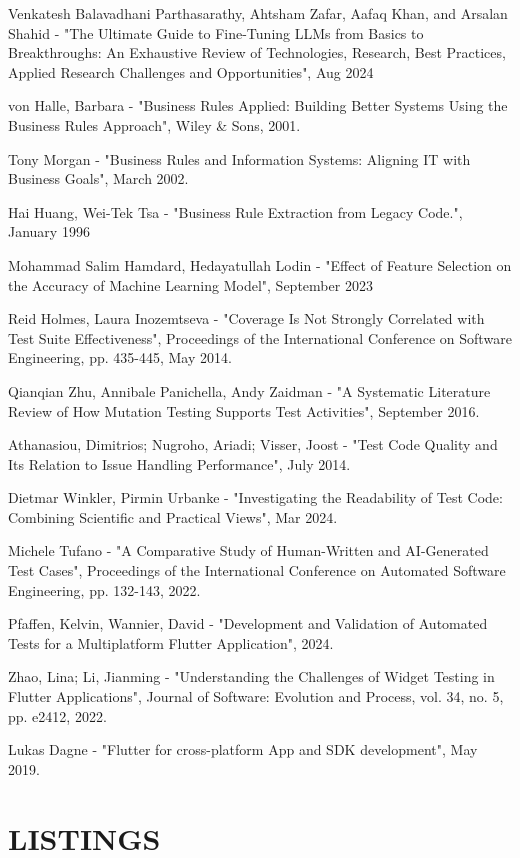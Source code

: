 \documentclass[12pt, twoside]{report}
\makeatletter
\newcommand\AppendixName{Appendix}
\let\oldappendix\appendix
\renewcommand{\appendix}{%
  \oldappendix
  \renewcommand{\chaptername}{\AppendixName}  \renewcommand{\thechapter}{\@Alph\c@chapter}}
\makeatother
\begin{document}
\begin{thebibliography}{99}
Venkatesh Balavadhani Parthasarathy, Ahtsham Zafar, Aafaq Khan, and Arsalan Shahid - "The Ultimate Guide to Fine-Tuning LLMs from Basics to Breakthroughs: An Exhaustive Review of Technologies, Research, Best Practices, Applied Research Challenges and Opportunities", Aug 2024

von Halle, Barbara - "Business Rules Applied: Building Better Systems Using the Business Rules Approach", Wiley \& Sons, 2001.

Tony Morgan - "Business Rules and Information Systems: Aligning IT with Business Goals", March 2002.

Hai Huang, Wei-Tek Tsa - "Business Rule Extraction from Legacy Code.", January 1996

Mohammad Salim Hamdard, Hedayatullah Lodin - "Effect of Feature Selection on the Accuracy of Machine Learning Model", September 2023

Reid Holmes, Laura Inozemtseva - "Coverage Is Not Strongly Correlated with Test Suite Effectiveness", Proceedings of the International Conference on Software Engineering, pp. 435-445, May 2014.

Qianqian Zhu, Annibale Panichella, Andy Zaidman - "A Systematic Literature Review of How Mutation Testing Supports Test Activities", September 2016.

Athanasiou, Dimitrios; Nugroho, Ariadi; Visser, Joost - "Test Code Quality and Its Relation to Issue Handling Performance", July 2014.

Dietmar Winkler, Pirmin Urbanke - "Investigating the Readability of Test Code: Combining Scientific and Practical Views", Mar 2024.

Michele Tufano - "A Comparative Study of Human-Written and AI-Generated Test Cases", Proceedings of the International Conference on Automated Software Engineering, pp. 132-143, 2022.

Pfaffen, Kelvin, Wannier, David - "Development and Validation of Automated Tests for a Multiplatform Flutter Application", 2024.

Zhao, Lina; Li, Jianming - "Understanding the Challenges of Widget Testing in Flutter Applications", Journal of Software: Evolution and Process, vol. 34, no. 5, pp. e2412, 2022.

Lukas Dagne - "Flutter for cross-platform App and SDK development", May 2019.

\end{thebibliography}

\appendix
\chapter{LISTINGS}

\end{document}
